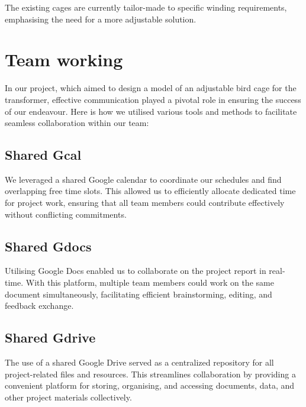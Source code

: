 \documentclass[a4paper,10pt]{article}
\begin{document}
The existing cages are currently tailor-made to specific winding requirements, emphasising the need for a more adjustable solution.



\section{Team working}
In our project, which aimed to design a model of an adjustable bird cage for the transformer, effective communication played a pivotal role in ensuring the success of our endeavour. Here is how we utilised various tools and methods to facilitate seamless collaboration within our team:

\subsection{Shared Gcal}
We leveraged a shared Google calendar to coordinate our schedules and find overlapping free time slots. This allowed us to efficiently allocate dedicated time for project work, ensuring that all team members could contribute effectively without conflicting commitments.

\subsection{Shared Gdocs}
Utilising Google Docs enabled us to collaborate on the project report in real-time. With this platform, multiple team members could work on the same document simultaneously, facilitating efficient brainstorming, editing, and feedback exchange.

\subsection{Shared Gdrive}
The use of a shared Google Drive served as a centralized repository for all project-related files and resources. This streamlines collaboration by providing a convenient platform for storing, organising, and accessing documents, data, and other project materials collectively.
\end{document}

